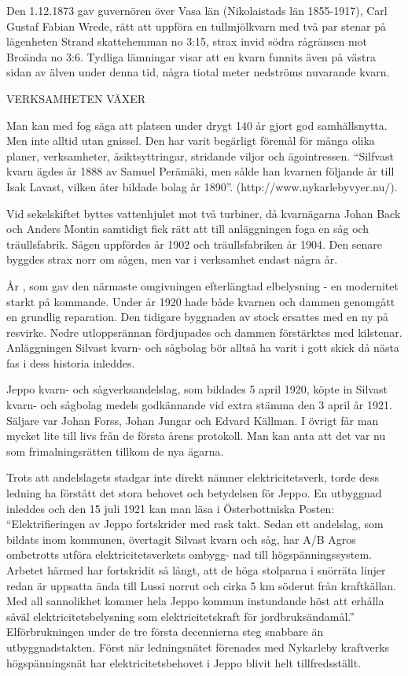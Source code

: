 Den 1.12.1873 gav guvernören över Vasa län (Nikolaistads län 1855-1917), Carl Gustaf Fabian Wrede, rätt att uppföra en tullmjölkvarn med två par stenar på lägenheten Strand skattehemman no 3:15, strax invid södra rågränsen mot Broända no 3:6. Tydliga lämningar visar att en kvarn funnits även på västra sidan av älven under denna tid, några tiotal meter nedströms nuvarande kvarn.


VERKSAMHETEN VÄXER

Man kan med fog säga att platsen under drygt 140 år gjort god samhällsnytta. Men inte alltid utan gnissel. Den har varit begärligt föremål för många olika planer, verksamheter, åsiktsyttringar, stridande viljor och ägointressen. ``Silfvast kvarn ägdes år 1888 av Samuel Perämäki, men sålde han kvarnen följande år till Isak Lavast, vilken åter bildade bolag år 1890''. (http://www.nykarlebyvyer.nu/).

Vid sekelskiftet byttes vattenhjulet mot två turbiner, då kvarnägarna Johan Back och Anders Montin samtidigt fick rätt att till anläggningen foga en såg och träullsfabrik. Sågen uppfördes år 1902 och träullsfabriken år 1904. Den senare byggdes strax norr om sågen, men var i verksamhet endast några år.

År , som gav den närmaste omgivningen efterlängtad elbelysning - en modernitet starkt på kommande. Under år 1920 hade både kvarnen och dammen genomgått en grundlig reparation. Den tidigare byggnaden av stock ersattes med en ny på resvirke. Nedre utloppsrännan fördjupades och dammen förstärktes med kilstenar. Anläggningen Silvast kvarn- och sågbolag bör alltså ha varit i gott skick då nästa fas i dess historia inleddes.

Jeppo kvarn- och sågverksandelslag, som bildades 5 april 1920,  köpte in Silvast kvarn- och sågbolag medels godkännande vid extra stämma den 3 april år 1921. Säljare var Johan Forss, Johan Jungar och Edvard Källman. I övrigt får man mycket lite till livs från de första årens protokoll. Man kan anta att det var nu som frimalningsrätten tillkom de nya ägarna.

Trots att andelslagets stadgar inte direkt nämner elektricitetsverk, torde dess ledning ha förstått det stora behovet och betydelsen för Jeppo. En utbyggnad inleddes och den 15 juli 1921 kan man läsa i Österbottniska Posten: ``Elektrifieringen av Jeppo fortskrider med rask takt. Sedan ett andelslag, som bildats inom kommunen, övertagit Silvast kvarn och såg, har A/B Agros ombetrotts utföra elektricitetsverkets ombygg- nad till högspänningssystem. Arbetet härmed har fortskridit så långt, att de höga stolparna i snörräta linjer redan är uppsatta ända till Lussi norrut och cirka 5 km söderut från kraftkällan. Med all sannolikhet kommer hela Jeppo kommun instundande höst att erhålla såväl elektricitetsbelysning som elektricitetskraft för jordbruksändamål.''  Elförbrukningen under de tre första decennierna steg snabbare än utbyggnadstakten. Först när ledningsnätet förenades med Nykarleby kraftverks högspänningsnät har elektricitetsbehovet i Jeppo blivit helt tillfredsställt.

